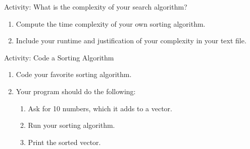 \documentclass[]{beamer}
\begin{document}
\begin{frame}{Activity: What is the complexity of your search algorithm?}
\begin{enumerate}
    \item Compute the time complexity of your own sorting algorithm.
    \item Include your runtime and justification of your complexity in
        your text file.
\end{enumerate}
\end{frame}

\begin{frame}{Activity: Code a Sorting Algorithm}
\begin{enumerate}
    \item Code your favorite sorting algorithm.
    \item Your program should do the following:
    \begin{enumerate}
        \item Ask for 10 numbers, which it adds to a vector.
        \item Run your sorting algorithm.
        \item Print the sorted vector.
    \end{enumerate}
\end{enumerate}
\end{frame}
\end{document}
